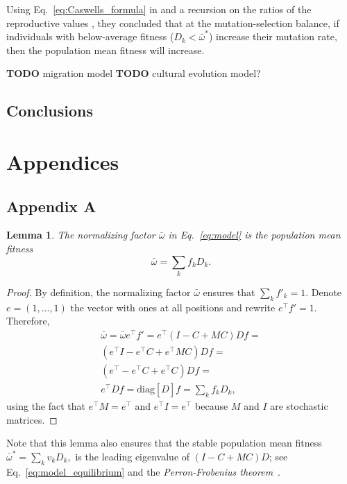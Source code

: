 \documentclass[9pt, a4paper, twocolumn]{extarticle}   	%
\newcommand*{\tr}{^\intercal}
\newcommand{\matrx}[1]{{\left[ \stackrel{}{#1}\right]}}
\newcommand{\diag}[1]{\mbox{diag}\matrx{#1}}
\newtheorem*{lemma}{Lemma}
\begin{document}
Using Eq.~\ref{eq:Caswells_formula} in  and a recursion on the ratios of the reproductive values \cite[see][eqs.~A5-6]{Ram2012}, they concluded that at the mutation-selection balance, if individuals with below-average fitness ($D_k < \bar{\omega}^*$) increase their mutation rate, then the population mean fitness will increase.

\textbf{TODO} migration model
\textbf{TODO} cultural evolution model?

\subsection*{Conclusions}

\section*{Appendices}
\subsection*{Appendix A}\label{sec:AppA}

\begin{lemma}
The normalizing factor $\bar{\omega}$ in Eq.~\ref{eq:model} is the population mean fitness
\begin{equation}
\bar{\omega} = \sum_k{f_k D_k}.
\end{equation}
\end{lemma}

\begin{proof}
By definition, the normalizing factor $\bar{\omega}$ ensures that $\sum_k{f'_k}=1$.
Denote $e = (1, ..., 1)$ the vector with ones at all positions and rewrite $e\tr f' = 1$.
Therefore, 
\begin{multline}\label{eq:mean_fitness}
\bar{\omega} = 
\bar{\omega} e\tr f' = 
e\tr (I - C + M C) D f = \\
(e\tr I - e\tr C + e\tr M C) D f = \\
(e\tr - e\tr C + e\tr C) D f = \\
e\tr D f = 
\diag{D} f = 
\sum_k{f_k D_k},
\end{multline}
using the fact that $e\tr M = e\tr$ and $e\tr I = e\tr$ because $M$ and $I$ are stochastic matrices.
\end{proof}

Note that this lemma also ensures that the stable population mean fitness $\bar{\omega}^*=\sum_k{v_k D_k},$ is the leading eigenvalue of $(I - C + M C) D$; see Eq.~\ref{eq:model_equilibrium} and the \emph{Perron-Frobenius theorem}~\cite[Appendix~A]{Otto2007}.
\end{document}
